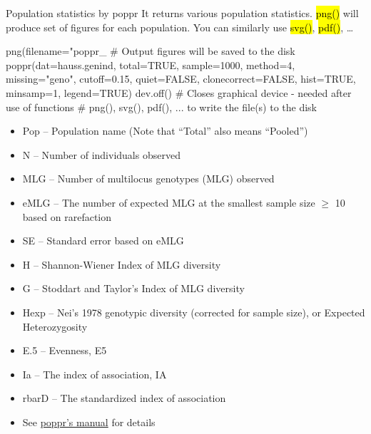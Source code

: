 \documentclass[compress, ucs, xelatex, 11pt, xcolor=svgnames,
  hyperref={
    bookmarks=true,
    unicode=true,
    colorlinks=true,
    pdftitle={Molecular data in R},
    plainpages=false,
    pdfauthor={Vojtech Zeisek},
    pdfsubject={Course about phylogeny and evolution in R},
    pdfcreator={XeLaTeX},
    pdfkeywords={R, evolution, phylogeny, molecular data},
    linkcolor=Tomato,
    anchorcolor=SaddleBrown,
    citecolor=Goldenrod,
    filecolor=DarkMagenta,
    menucolor=Sienna,
    urlcolor=DarkTurquoise,
    pdftex},
  url={hyphens, lowtilde} %
  ]{beamer}
\renewcommand{\texttt}[1]{\hl{\ttfamily #1}}
\begin{document}
\begin{frame}[fragile]{Population statistics by poppr}
It returns various population statistics. \texttt{png()} will produce set of figures for each population. You can similarly use \texttt{svg()}, \texttt{pdf()}, \ldots
  \begin{spluscode}
    png(filename="poppr_%
      # Output figures will be saved to the disk
    poppr(dat=hauss.genind, total=TRUE, sample=1000, method=4,
      missing="geno", cutoff=0.15, quiet=FALSE, clonecorrect=FALSE,
      hist=TRUE, minsamp=1, legend=TRUE)
    dev.off() # Closes graphical device - needed after use of functions
              # png(), svg(), pdf(), ... to write the file(s) to the disk
  \end{spluscode}
  \begin{tiny}
    \begin{multicols}{2}
      \begin{itemize}
	\item Pop -- Population name (Note that ``Total'' also means ``Pooled'')
	\item N -- Number of individuals observed
	\item MLG -- Number of multilocus genotypes (MLG) observed
	\item eMLG -- The number of expected MLG at the smallest sample size $\geq$ 10 based on rarefaction
	\item SE -- Standard error based on eMLG
	\item H -- Shannon-Wiener Index of MLG diversity
	\item G -- Stoddart and Taylor's Index of MLG diversity
	\item Hexp -- Nei's 1978 genotypic diversity (corrected for sample size), or Expected Heterozygosity
	\item E.5 -- Evenness, E5
	\item Ia -- The index of association, IA
	\item rbarD -- The standardized index of association
	\item See \href{http://grunwaldlab.cgrb.oregonstate.edu/primer-population-genetic-analysis-r/installation}{poppr's manual} for details
      \end{itemize}
    \end{multicols}
  \end{tiny}
\end{frame}
\end{document}
